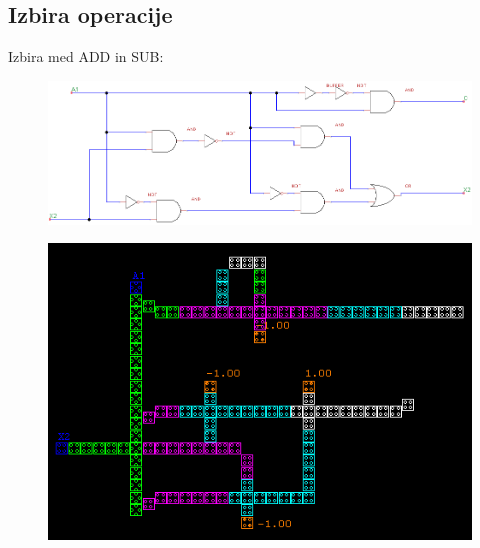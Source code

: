 \documentclass[seminar, slovene]{FRIreport}
\begin{document}
\begin{minipage}[H]{16cm}
\subsection{Izbira operacije}
Izbira med ADD in SUB:\\
\begin{figure}[H]
\begin{center}
\includegraphics[width=13cm]{vezja/img/demuxmux}
\end{center}
\end{figure}
\begin{figure}[H]
\begin{center}
\includegraphics[width=13cm]{qca/img/IzbiraOdstevalnika}
\end{center}
\end{figure}
\end{minipage}
\end{document}

